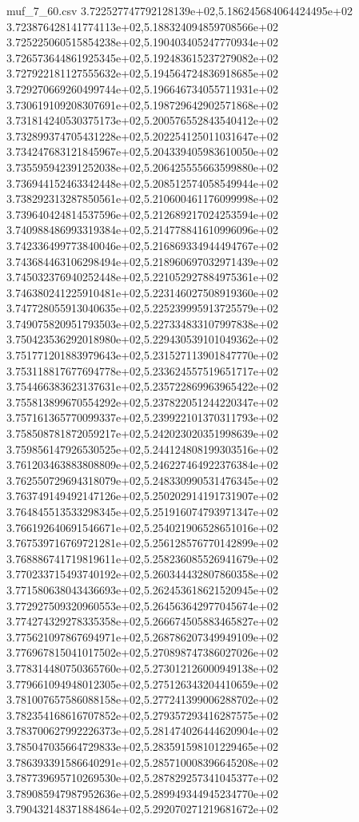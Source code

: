 \begin{filecontents*}{muf_7_60.csv}
3.722527747792128139e+02,5.186245684064424495e+02
3.723876428141774113e+02,5.188324094859708566e+02
3.725225060515854238e+02,5.190403405247770934e+02
3.726573644861925345e+02,5.192483615237279082e+02
3.727922181127555632e+02,5.194564724836918685e+02
3.729270669260499744e+02,5.196646734055711931e+02
3.730619109208307691e+02,5.198729642902571868e+02
3.731814240530375173e+02,5.200576552843540412e+02
3.732899374705431228e+02,5.202254125011031647e+02
3.734247683121845967e+02,5.204339405983610050e+02
3.735595942391252038e+02,5.206425555663599880e+02
3.736944152463342448e+02,5.208512574058549944e+02
3.738292313287850561e+02,5.210600461176099998e+02
3.739640424814537596e+02,5.212689217024253594e+02
3.740988486993319384e+02,5.214778841610996096e+02
3.742336499773840046e+02,5.216869334944494767e+02
3.743684463106298494e+02,5.218960697032971439e+02
3.745032376940252448e+02,5.221052927884975361e+02
3.746380241225910481e+02,5.223146027508919360e+02
3.747728055913040635e+02,5.225239995913725579e+02
3.749075820951793503e+02,5.227334833107997838e+02
3.750423536292018980e+02,5.229430539101049362e+02
3.751771201883979643e+02,5.231527113901847770e+02
3.753118817677694778e+02,5.233624557519651717e+02
3.754466383623137631e+02,5.235722869963965422e+02
3.755813899670554292e+02,5.237822051244220347e+02
3.757161365770099337e+02,5.239922101370311793e+02
3.758508781872059217e+02,5.242023020351998639e+02
3.759856147926530525e+02,5.244124808199303516e+02
3.761203463883808809e+02,5.246227464922376384e+02
3.762550729694318079e+02,5.248330990531476345e+02
3.763749149492147126e+02,5.250202914191731907e+02
3.764845513533298345e+02,5.251916074793971347e+02
3.766192640691546671e+02,5.254021906528651016e+02
3.767539716769721281e+02,5.256128576770142899e+02
3.768886741719819611e+02,5.258236085526941679e+02
3.770233715493740192e+02,5.260344432807860358e+02
3.771580638043436693e+02,5.262453618621520945e+02
3.772927509320960553e+02,5.264563642977045674e+02
3.774274329278335358e+02,5.266674505883465827e+02
3.775621097867694971e+02,5.268786207349949109e+02
3.776967815041017502e+02,5.270898747386027026e+02
3.778314480750365760e+02,5.273012126000949138e+02
3.779661094948012305e+02,5.275126343204410659e+02
3.781007657586088158e+02,5.277241399006288702e+02
3.782354168616707852e+02,5.279357293416287575e+02
3.783700627992226373e+02,5.281474026444620904e+02
3.785047035664729833e+02,5.283591598101229465e+02
3.786393391586640291e+02,5.285710008396645208e+02
3.787739695710269530e+02,5.287829257341045377e+02
3.789085947987952636e+02,5.289949344945234770e+02
3.790432148371884864e+02,5.292070271219681672e+02

\end{filecontents*}
